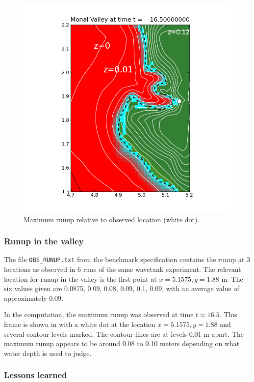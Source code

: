 \begin{figure}[ht]
\hfil\includegraphics[width=5.0in]{bp7/figs423/contours.png}\hfil
\caption{\label{fig:bp7runup} 
Maximum runup relative to observed location (white dot).
  }
\end{figure}

\subsubsection{Runup in the valley}
The file {\tt OBS\_RUNUP.txt} from the benchmark specification contains
the runup at 3 locations as observed in 6 runs of the same wavetank
experiment.  The relevant location for runup in the valley is the first
point at $x=5.1575, y=1.88$ m.  The six values given are 0.0875, 0.09,
0.08, 0.09, 0.1, 0.09, with an average value of approximately $0.09$.

In the computation, the maximum runup was observed at time $t\approx 16.5$.
This frame is shown in  with a white dot at the location
$x=5.1575, y=1.88$ and several contour levels marked.  The contour lines are
at levels 0.01 m apart.  The maximum runup appears to be around 0.08 to 0.10
meters depending on what water depth is used to judge.

\subsubsection{Lessons learned}





